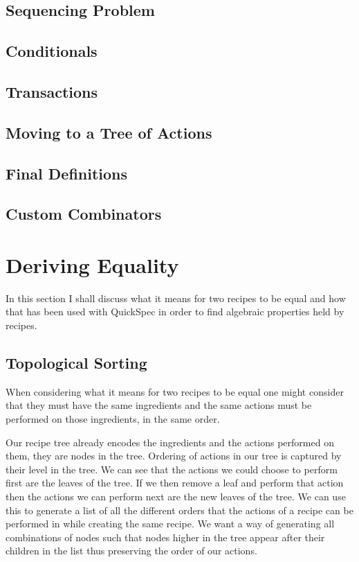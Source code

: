 \documentclass[11pt]{article}
\begin{document}
\subsection{Sequencing Problem}
\subsection{Conditionals}
\subsection{Transactions}
\subsection{Moving to a Tree of Actions}
\subsection{Final Definitions}
\subsection{Custom Combinators}

\section{Deriving Equality}
In this section I shall discuss what it means for two recipes
to be equal and how that has been used with QuickSpec \cite{quickspec, quickspec2}
in order to find algebraic properties held by recipes.

\subsection{Topological Sorting}
When considering what it means for two recipes to be equal one
might consider that they must have the same ingredients
and the same actions must be performed on those ingredients,
in the same order.

\medbreak

Our recipe tree already encodes the ingredients and the actions
performed on them, they are nodes in the tree. Ordering of
actions in our tree is captured by their level in the tree.
We can see that the actions we could choose to perform first
are the leaves of the tree. If we then remove a leaf and perform
that action then the actions we can perform next are the new
leaves of the tree. We can use this to generate a list of all
the different orders that the actions of a recipe can be performed
in while creating the same recipe. We want a way of generating
all combinations of nodes such that nodes higher in the tree
appear after their children in the list thus preserving the
order of our actions.
\end{document}
